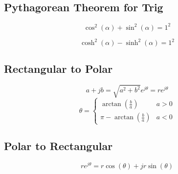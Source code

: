 \subsection{Pythagorean Theorem for Trig}\label{subsec:Pythagorean Theorem for Trig}
\begin{equation}\label{eq:Pythagorean Theorem for Trig}
  \cos^{2}(\alpha) + \sin^{2}(\alpha) = 1^{2}
\end{equation}

\begin{equation}\label{eq:Pythagorean_Hyperbolic_Trig}
  \cosh^{2}(\alpha) - \sinh^{2}(\alpha) = 1^{2}
\end{equation}

\subsection{Rectangular to Polar}\label{subsec:Rectangular to Polar}
\begin{equation}\label{eq:Rectangular to Polar-Magnitude}
  a + j b = \sqrt{a^{2}+b^{2}} e^{j \theta} = re^{j \theta}
\end{equation}
\begin{equation}\label{eq:Rectangular to Polar-Angle}
  \theta = \begin{cases}
    \arctan \left( \frac{b}{a} \right) & a>0 \\
    \pi - \arctan \left( \frac{b}{a} \right) & a<0
  \end{cases}
\end{equation}

\subsection{Polar to Rectangular}\label{subsec:Polar to Rectangular}
\begin{equation}\label{eq:Polar to Rectangular}
  re^{j \theta} = r \cos \left( \theta \right) + j r \sin \left( \theta \right)
\end{equation}